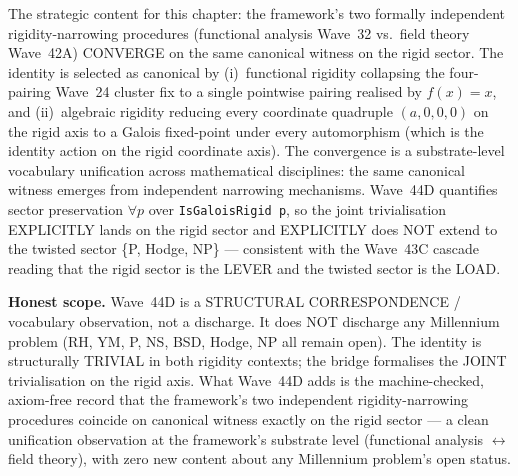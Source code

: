 \begin{remark}
\begin{itemize}
\end{itemize}
The strategic content for this chapter: the framework's two formally independent rigidity-narrowing procedures (functional analysis Wave~32 vs.\ field theory Wave~42A) CONVERGE on the same canonical witness on the rigid sector. The identity is selected as canonical by (i)~functional rigidity collapsing the four-pairing Wave~24 cluster fix to a single pointwise pairing realised by $f(x) = x$, and (ii)~algebraic rigidity reducing every coordinate quadruple $(a, 0, 0, 0)$ on the rigid axis to a Galois fixed-point under every automorphism (which is the identity action on the rigid coordinate axis). The convergence is a substrate-level vocabulary unification across mathematical disciplines: the same canonical witness emerges from independent narrowing mechanisms. Wave~44D quantifies sector preservation $\forall p$ over \texttt{IsGaloisRigid p}, so the joint trivialisation EXPLICITLY lands on the rigid sector and EXPLICITLY does NOT extend to the twisted sector \{P, Hodge, NP\} --- consistent with the Wave~43C cascade reading that the rigid sector is the LEVER and the twisted sector is the LOAD.

\textbf{Honest scope.} Wave~44D is a STRUCTURAL CORRESPONDENCE / vocabulary observation, not a discharge. It does NOT discharge any Millennium problem (RH, YM, P, NS, BSD, Hodge, NP all remain open). The identity is structurally TRIVIAL in both rigidity contexts; the bridge formalises the JOINT trivialisation on the rigid axis. What Wave~44D adds is the machine-checked, axiom-free record that the framework's two independent rigidity-narrowing procedures coincide on canonical witness exactly on the rigid sector --- a clean unification observation at the framework's substrate level (functional analysis $\leftrightarrow$ field theory), with zero new content about any Millennium problem's open status.
\end{remark}

